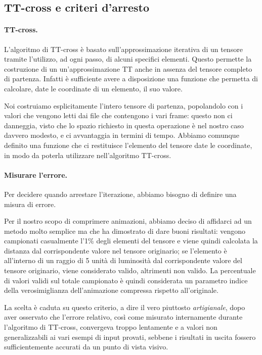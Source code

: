 \documentclass[11pt,a4paper]{article}
\begin{document}
\subsection{TT-cross e criteri d'arresto}
\paragraph{TT-cross.}
L'algoritmo di TT-cross è basato sull'approssimazione iterativa di un tensore tramite l'utilizzo, ad ogni passo, di alcuni specifici elementi.
Questo permette la costruzione di un un'approssimazione TT anche in assenza del tensore completo di partenza. Infatti è sufficiente avere a disposizione una funzione che permetta di calcolare, date le coordinate di un elemento, il suo valore.

Noi costruiamo esplicitamente l'intero tensore di partenza, popolandolo con i valori che vengono letti dai file che contengono i vari frame: questo non ci danneggia, visto che lo spazio richiesto in questa operazione è nel nostro caso davvero modesto, e ci avvantaggia in termini di tempo. Abbiamo comunque definito una funzione che ci restituisce l'elemento del tensore date le coordinate, in modo da poterla utilizzare nell'algoritmo TT-cross.

\paragraph{Misurare l'errore.}
Per decidere quando arrestare l'iterazione, abbiamo bisogno di definire una misura di errore.

Per il nostro scopo di comprimere animazioni, abbiamo deciso di affidarci ad un metodo molto semplice ma che ha dimostrato di dare buoni risultati: vengono campionati casualmente l'1\% degli elementi del tensore e viene quindi calcolata la distanza dal corrispondente valore nel tensore originario; se l'elemento è all'interno di un raggio di 5 unità di luminosità dal corrispondente valore del tensore originario, viene considerato valido, altrimenti non valido.
La percentuale di valori validi sul totale campionato è quindi considerata un parametro indice della verosimiglianza dell'animazione compressa rispetto all'originale.

La scelta è caduta su questo criterio, a dire il vero piuttosto \emph{artigianale}, dopo aver osservato che l'errore relativo, così come misurato internamente durante l'algoritmo di TT-cross, convergeva troppo lentamente e a valori non generalizzabili ai vari esempi di input provati, sebbene i risultati in uscita fossero sufficientemente accurati da un punto di vista visivo.
\end{document}
